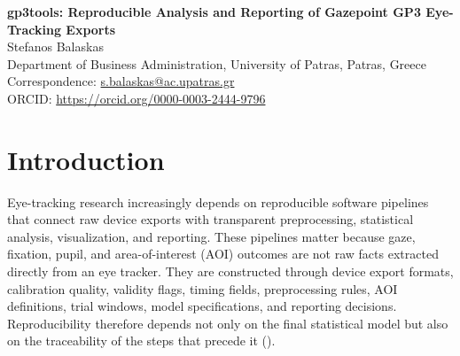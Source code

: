 \documentclass[
]{article}
\author{}
\date{\vspace{-2.5em}}
\begin{document}
\begin{center}
{\LARGE \textbf{gp3tools: Reproducible Analysis and Reporting of Gazepoint GP3 Eye-Tracking Exports}\\}
\vspace{1em}
Stefanos Balaskas\\
Department of Business Administration, University of Patras, Patras, Greece\\
Correspondence: \href{mailto:s.balaskas@ac.upatras.gr}{s.balaskas@ac.upatras.gr}\\
ORCID: \href{https://orcid.org/0000-0003-2444-9796}{https://orcid.org/0000-0003-2444-9796}
\end{center}

\begin{abstract}
Eye-tracking studies increasingly require reproducible software pipelines that connect device exports with transparent preprocessing, quality control, statistical analysis, visualization, and reporting. Gazepoint GP3 and Gazepoint Analysis exports provide accessible gaze, fixation, pupil, timing, media, and area-of-interest data, but exported CSV folders usually require systematic validation before they can support defensible inference. \texttt{gp3tools} is an R package for importing, validating, preprocessing, modelling, visualising, and reporting Gazepoint GP3 / Gazepoint Analysis exports. The package supports file discovery, file-pair validation, sampling diagnostics, tracking-quality summaries, pupil preprocessing, area-of-interest summaries, fixation and transition workflows, model-ready data preparation, diagnostic plotting, exclusion recommendations, reporting checklists, and reproducible report generation. This paper presents the motivation, design, validation strategy, and synthetic demonstration workflow of \texttt{gp3tools}. The demonstration is used to evaluate workflow reproducibility and software behaviour; it is not used to draw substantive psychological, perceptual, or marketing conclusions. The package fills a practical gap between vendor-specific Gazepoint CSV exports and publication-ready R workflows for transparent eye-tracking analysis.
\end{abstract}

\section{Introduction}\label{introduction}

Eye-tracking research increasingly depends on reproducible software
pipelines that connect raw device exports with transparent
preprocessing, statistical analysis, visualization, and reporting. These
pipelines matter because gaze, fixation, pupil, and area-of-interest
(AOI) outcomes are not raw facts extracted directly from an eye tracker.
They are constructed through device export formats, calibration quality,
validity flags, timing fields, preprocessing rules, AOI definitions,
trial windows, model specifications, and reporting decisions.
Reproducibility therefore depends not only on the final statistical
model but also on the traceability of the steps that precede it
().
\end{document}

